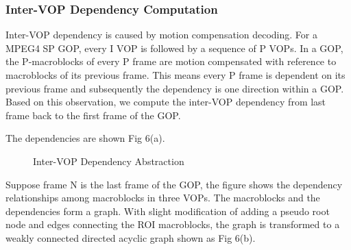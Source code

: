 \subsubsection{Inter-VOP Dependency Computation}
Inter-VOP dependency is caused by motion compensation decoding. For a MPEG4 SP GOP, every I VOP is followed by a sequence of P VOPs.
In a GOP, the P-macroblocks of every P frame are motion compensated with reference to macroblocks of its previous frame. This means every P frame is dependent on its previous frame and subsequently the dependency is one direction within a GOP. Based on this observation, we compute the inter-VOP dependency from last frame back to the first frame of the GOP. 

The dependencies are shown Fig 6(a). 
\begin{figure}
\centering
\quad\quad
{}
\caption{Inter-VOP Dependency Abstraction} 
\end{figure}
Suppose frame N is the last frame of the GOP, the figure shows the dependency relationships among macroblocks in three VOPs. The macroblocks and the dependencies form a graph. With slight modification of adding a pseudo root node and edges connecting the ROI macroblocks, the graph is transformed to a weakly connected directed acyclic graph shown as Fig 6(b). 


